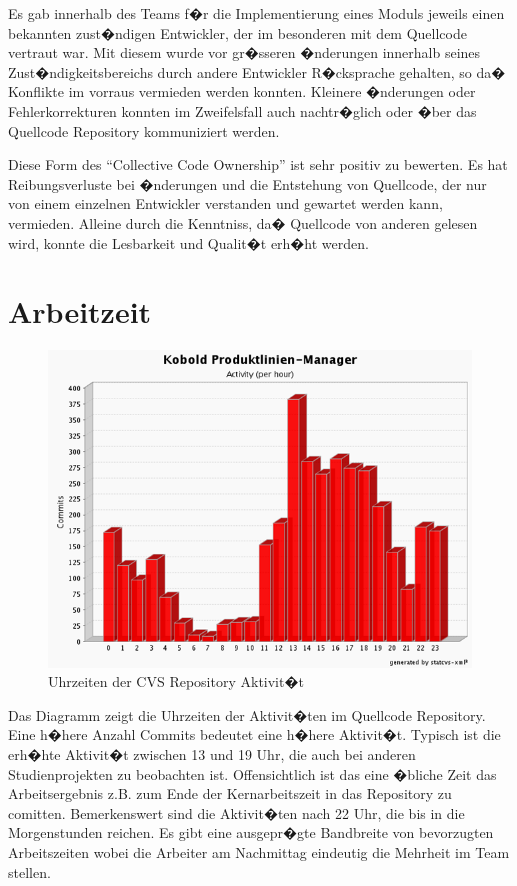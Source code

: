 \documentclass[a4paper,titlepage,12pt,ngerman]{scrbook}
\begin{document}
Es gab innerhalb des Teams f�r die Implementierung eines Moduls
jeweils einen bekannten zust�ndigen Entwickler, der im besonderen mit
dem Quellcode vertraut war. Mit diesem wurde vor gr�sseren �nderungen
innerhalb seines Zust�ndigkeitsbereichs durch andere Entwickler
R�cksprache gehalten, so da� Konflikte im vorraus vermieden werden
konnten. Kleinere �nderungen oder Fehlerkorrekturen konnten im
Zweifelsfall auch nachtr�glich oder �ber das Quellcode Repository
kommuniziert werden.

Diese Form des ``Collective Code Ownership'' ist sehr positiv zu
bewerten. Es hat Reibungsverluste bei �nderungen und die Entstehung
von Quellcode, der nur von einem einzelnen Entwickler verstanden und
gewartet werden kann, vermieden. Alleine durch die Kenntniss, da�
Quellcode von anderen gelesen wird, konnte die Lesbarkeit und Qualit�t
erh�ht werden.



\section{Arbeitzeit}

\begin{figure}[h!]
  \centering
  \includegraphics[width=15cm]{praesentation/commit_by_hour}
  \caption{Uhrzeiten der CVS Repository Aktivit�t}
\end{figure}

Das Diagramm zeigt die Uhrzeiten der Aktivit�ten im Quellcode
Repository. Eine h�here Anzahl Commits bedeutet eine h�here
Aktivit�t. Typisch ist die erh�hte Aktivit�t zwischen 13 und 19 Uhr,
die auch bei anderen Studienprojekten zu beobachten
ist. Offensichtlich ist das eine �bliche Zeit das Arbeitsergebnis z.B.
zum Ende der Kernarbeitszeit in das Repository zu
comitten. Bemerkenswert sind die Aktivit�ten nach 22 Uhr, die bis in
die Morgenstunden reichen. Es gibt eine ausgepr�gte
Bandbreite von bevorzugten Arbeitszeiten wobei die Arbeiter am Nachmittag
eindeutig die Mehrheit im Team stellen. 
\end{document}
